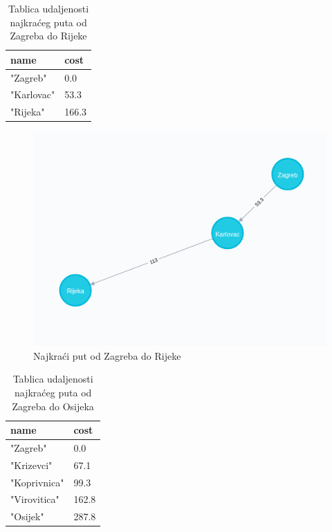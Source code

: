 \documentclass[10pt]{scrartcl}
\begin{document}
\begin{table}[H]
\centering
\caption{Tablica udaljenosti najkraćeg puta od Zagreba do Rijeke}
\begin{tabular}{|l|l|}
\hline
\textbf{name} & \textbf{cost} \\ \hline
"Zagreb"      & 0.0           \\ \hline
"Karlovac"    & 53.3          \\ \hline
"Rijeka"      & 166.3         \\ \hline
\end{tabular}
\end{table}

\begin{figure}[H]
    \centering
    \includegraphics[scale=0.4]{zg-ri}
    \caption{Najkraći put od Zagreba do Rijeke}
\end{figure}


\begin{table}[H]
\centering
\caption{Tablica udaljenosti najkraćeg puta od Zagreba do Osijeka}
\begin{tabular}{|l|l|}
\hline
\textbf{name} & \textbf{cost} \\ \hline
"Zagreb"      & 0.0           \\ \hline
"Krizevci"    & 67.1          \\ \hline
"Koprivnica"  & 99.3          \\ \hline
"Virovitica"  & 162.8         \\ \hline
"Osijek"      & 287.8         \\ \hline
\end{tabular}
\end{table}
\end{document}
